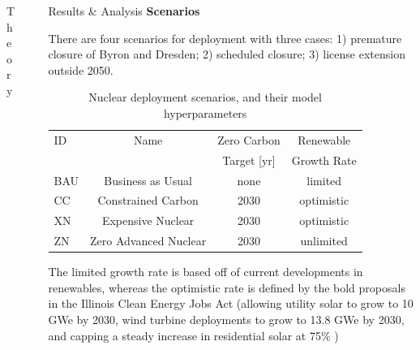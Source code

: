 \documentclass[final]{beamer}
\newlength{\sepwid}
\newlength{\onecolwid}
\newlength{\threecolwid}
\begin{document}
\begin{frame}[t]
\begin{columns}[t,totalwidth=\threecolwid]
\begin{column}{\onecolwid}
\begin{block}{Theory}
\end{block}



\end{column} %

\begin{column}{\sepwid}\end{column} %



\begin{column}{\onecolwid} %

\begin{block}{Results \& Analysis}
\vspace{0.7em}
\textbf{Scenarios}
\vspace{0.7em}

There are four scenarios for deployment with three cases: 1) premature closure of Byron and Dresden; 2) scheduled closure; 3) license extension outside 2050.
\begin{table}[]
	\label{tab:scenarios}
	\caption{Nuclear deployment scenarios, and their model hyperparameters \cite{dotson}}
	\begin{tabular}{lccc}
	\hline
	ID  &  Name  &  Zero Carbon  &  Renewable \\
	& & Target [yr] & Growth Rate\\ \hline
	BAU & Business as Usual     & none & limited \\
	CC  & Constrained Carbon    & 2030 & optimistic\\
	XN  & Expensive Nuclear     & 2030 & optimistic \\
	ZN  & Zero Advanced Nuclear & 2030 & unlimited \\ \hline
	\end{tabular}
\end{table}
The limited growth rate is based off of current developments in renewables, whereas the optimistic rate is defined by the bold proposals in the Illinois Clean Energy Jobs Act (allowing utility solar to grow to 10 GWe by 2030, wind turbine deployments to grow to 13.8 GWe by 2030, and capping a steady increase in residential solar at 75\% \cite{gagnon_rooftop_2016})


\end{block}
\end{column}
\end{columns}
\end{frame}
\end{document}
